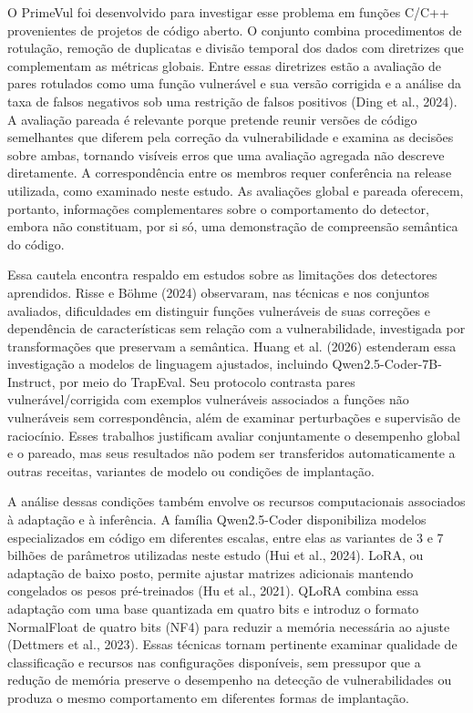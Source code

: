 \documentclass[12pt,a4paper]{article}
\begin{document}
O PrimeVul foi desenvolvido para investigar esse problema em funções C/C++ provenientes de projetos de código aberto. O conjunto combina procedimentos de rotulação, remoção de duplicatas e divisão temporal dos dados com diretrizes que complementam as métricas globais. Entre essas diretrizes estão a avaliação de pares rotulados como uma função vulnerável e sua versão corrigida e a análise da taxa de falsos negativos sob uma restrição de falsos positivos (Ding et al., 2024). A avaliação pareada é relevante porque pretende reunir versões de código semelhantes que diferem pela correção da vulnerabilidade e examina as decisões sobre ambas, tornando visíveis erros que uma avaliação agregada não descreve diretamente. A correspondência entre os membros requer conferência na release utilizada, como examinado neste estudo. As avaliações global e pareada oferecem, portanto, informações complementares sobre o comportamento do detector, embora não constituam, por si só, uma demonstração de compreensão semântica do código.

Essa cautela encontra respaldo em estudos sobre as limitações dos detectores aprendidos. Risse e Böhme (2024) observaram, nas técnicas e nos conjuntos avaliados, dificuldades em distinguir funções vulneráveis de suas correções e dependência de características sem relação com a vulnerabilidade, investigada por transformações que preservam a semântica. Huang et al. (2026) estenderam essa investigação a modelos de linguagem ajustados, incluindo Qwen2.5-Coder-7B-Instruct, por meio do TrapEval. Seu protocolo contrasta pares vulnerável/corrigida com exemplos vulneráveis associados a funções não vulneráveis sem correspondência, além de examinar perturbações e supervisão de raciocínio. Esses trabalhos justificam avaliar conjuntamente o desempenho global e o pareado, mas seus resultados não podem ser transferidos automaticamente a outras receitas, variantes de modelo ou condições de implantação.

A análise dessas condições também envolve os recursos computacionais associados à adaptação e à inferência. A família Qwen2.5-Coder disponibiliza modelos especializados em código em diferentes escalas, entre elas as variantes de 3 e 7 bilhões de parâmetros utilizadas neste estudo (Hui et al., 2024). LoRA, ou adaptação de baixo posto, permite ajustar matrizes adicionais mantendo congelados os pesos pré-treinados (Hu et al., 2021). QLoRA combina essa adaptação com uma base quantizada em quatro bits e introduz o formato NormalFloat de quatro bits (NF4) para reduzir a memória necessária ao ajuste (Dettmers et al., 2023). Essas técnicas tornam pertinente examinar qualidade de classificação e recursos nas configurações disponíveis, sem pressupor que a redução de memória preserve o desempenho na detecção de vulnerabilidades ou produza o mesmo comportamento em diferentes formas de implantação.
\end{document}
